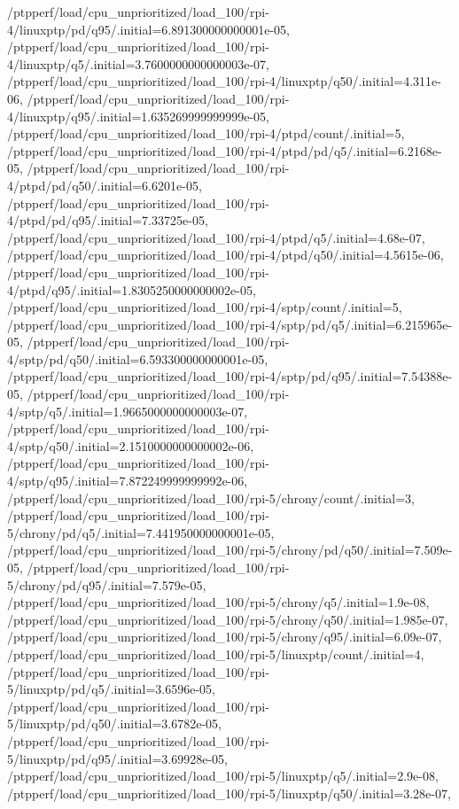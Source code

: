 {    /ptpperf/load/cpu_unprioritized/load_100/rpi-4/linuxptp/pd/q95/.initial=6.891300000000001e-05,
    /ptpperf/load/cpu_unprioritized/load_100/rpi-4/linuxptp/q5/.initial=3.7600000000000003e-07,
    /ptpperf/load/cpu_unprioritized/load_100/rpi-4/linuxptp/q50/.initial=4.311e-06,
    /ptpperf/load/cpu_unprioritized/load_100/rpi-4/linuxptp/q95/.initial=1.635269999999999e-05,
    /ptpperf/load/cpu_unprioritized/load_100/rpi-4/ptpd/count/.initial=5,
    /ptpperf/load/cpu_unprioritized/load_100/rpi-4/ptpd/pd/q5/.initial=6.2168e-05,
    /ptpperf/load/cpu_unprioritized/load_100/rpi-4/ptpd/pd/q50/.initial=6.6201e-05,
    /ptpperf/load/cpu_unprioritized/load_100/rpi-4/ptpd/pd/q95/.initial=7.33725e-05,
    /ptpperf/load/cpu_unprioritized/load_100/rpi-4/ptpd/q5/.initial=4.68e-07,
    /ptpperf/load/cpu_unprioritized/load_100/rpi-4/ptpd/q50/.initial=4.5615e-06,
    /ptpperf/load/cpu_unprioritized/load_100/rpi-4/ptpd/q95/.initial=1.8305250000000002e-05,
    /ptpperf/load/cpu_unprioritized/load_100/rpi-4/sptp/count/.initial=5,
    /ptpperf/load/cpu_unprioritized/load_100/rpi-4/sptp/pd/q5/.initial=6.215965e-05,
    /ptpperf/load/cpu_unprioritized/load_100/rpi-4/sptp/pd/q50/.initial=6.593300000000001e-05,
    /ptpperf/load/cpu_unprioritized/load_100/rpi-4/sptp/pd/q95/.initial=7.54388e-05,
    /ptpperf/load/cpu_unprioritized/load_100/rpi-4/sptp/q5/.initial=1.9665000000000003e-07,
    /ptpperf/load/cpu_unprioritized/load_100/rpi-4/sptp/q50/.initial=2.1510000000000002e-06,
    /ptpperf/load/cpu_unprioritized/load_100/rpi-4/sptp/q95/.initial=7.872249999999992e-06,
    /ptpperf/load/cpu_unprioritized/load_100/rpi-5/chrony/count/.initial=3,
    /ptpperf/load/cpu_unprioritized/load_100/rpi-5/chrony/pd/q5/.initial=7.441950000000001e-05,
    /ptpperf/load/cpu_unprioritized/load_100/rpi-5/chrony/pd/q50/.initial=7.509e-05,
    /ptpperf/load/cpu_unprioritized/load_100/rpi-5/chrony/pd/q95/.initial=7.579e-05,
    /ptpperf/load/cpu_unprioritized/load_100/rpi-5/chrony/q5/.initial=1.9e-08,
    /ptpperf/load/cpu_unprioritized/load_100/rpi-5/chrony/q50/.initial=1.985e-07,
    /ptpperf/load/cpu_unprioritized/load_100/rpi-5/chrony/q95/.initial=6.09e-07,
    /ptpperf/load/cpu_unprioritized/load_100/rpi-5/linuxptp/count/.initial=4,
    /ptpperf/load/cpu_unprioritized/load_100/rpi-5/linuxptp/pd/q5/.initial=3.6596e-05,
    /ptpperf/load/cpu_unprioritized/load_100/rpi-5/linuxptp/pd/q50/.initial=3.6782e-05,
    /ptpperf/load/cpu_unprioritized/load_100/rpi-5/linuxptp/pd/q95/.initial=3.69928e-05,
    /ptpperf/load/cpu_unprioritized/load_100/rpi-5/linuxptp/q5/.initial=2.9e-08,
    /ptpperf/load/cpu_unprioritized/load_100/rpi-5/linuxptp/q50/.initial=3.28e-07,
}
